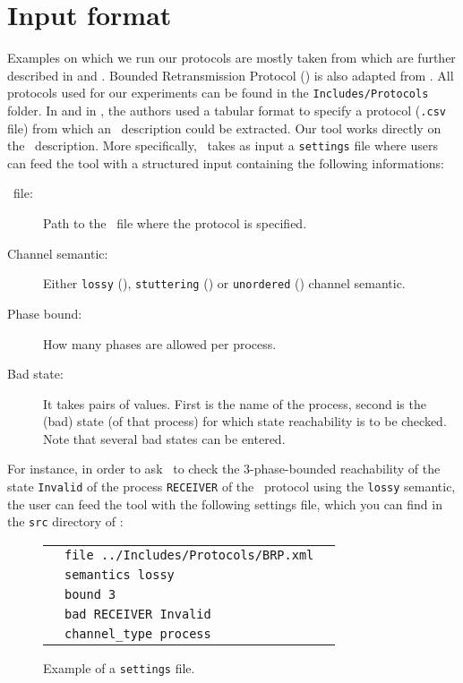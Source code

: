\section{Input format}
\label{sec:input}

Examples on which we run our protocols are mostly taken from \cite{JRSVgit} 
which are further described in \cite{MPSV11} and \cite{RSV11}.
Bounded Retransmission Protocol (\Brp) is also adapted from \cite{AABJ04}.
All protocols used for our experiments can be found in the \texttt{Includes/Protocols} folder.
%
In \cite{JRSVgit} and in \alternator, the authors used a tabular format to specify a protocol (\texttt{.csv} file)
from which an \Xml\ description could be extracted.
Our tool works directly on the \Xml\ description.
%
More specifically, \MPass\ takes as input a \texttt{settings} file where users can feed the tool with a structured input containing the following informations:

\begin{description}
\item[\Xml\ file:] Path to the \Xml\ file where the protocol is specified.
\item[Channel semantic:] Either \texttt{lossy} (\Lcs), \texttt{stuttering} (\Slcs) or \texttt{unordered} (\Ucs) channel semantic.
\item[Phase bound:] How many phases are allowed per process.
\item[Bad state:] It takes pairs of values.
%
First is the name of the process,  second is the (bad) state (of that process) for which state reachability is to be checked.
%
Note that several bad states can be entered.
\end{description}

For instance, in order to ask \MPass\ to check the $3$-phase-bounded reachability
of the state \texttt{Invalid} of the process \texttt{RECEIVER} of the \Brp\ protocol
using the \texttt{lossy} semantic,
the user can feed the tool with the following settings file, which you can find in the \texttt{src} directory of \MPass:

\begin{figure}[h]
\begin{center}
\begin{tabular}{ c l c}
&\texttt{file ../Includes/Protocols/BRP.xml}&\\
&\texttt{semantics lossy}&\\
&\texttt{bound 3}&\\
&\texttt{bad RECEIVER Invalid}&\\
&\texttt{channel\_type process}&\\
\end{tabular}
\end{center}
\caption{Example of a \texttt{settings} file.}
\label{fig:settings:file}
\end{figure}


